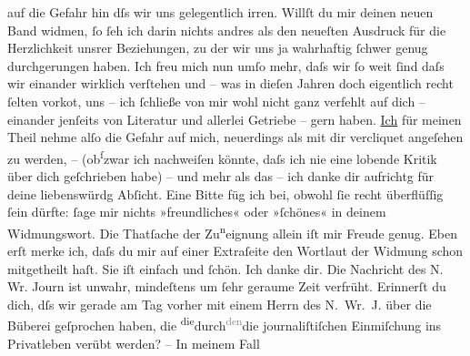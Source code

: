 \begin{ledgroupsized}[t]{13cm}
               auf die Gefahr hin dſs wir uns ge{\pb}legentlich irren.
               Willſt du mir deinen neuen
                  Band widmen, ſo ſeh ich darin nichts andres als den neueſten Ausdruck für die
               Herzlichkeit unsrer Beziehungen, zu der wir uns ja wahrhaftig ſchwer genug
               durchgerungen haben. Ich freu mich nun umſo mehr, daſs wir ſo weit ſind daſs wir
               einander wirklich verſtehen und – was in dieſen Jahren {\pb}doch eigentlich recht
               ſelten vorko{\geminationm}t, uns – ich ſchließe von mir wohl nicht
               ganz verfehlt auf dich – einander jenſeits von Literatur und allerlei Getriebe – gern
               haben. \uline{Ich} für meinen Theil nehme alſo die Gefahr auf
               mich, neuerdings als mit dir vercliquet angeſehen zu werden, \introOben{}–\introOben{} (ob\substVorne{}\textsuperscript{ſ}\substDazwischen{}z\substHinten{}war ich nachweiſen könnte, daſs ich nie eine lobende Kritik über dich
               geſchrieben habe) – und {\pb}mehr als das – ich danke dir aufrichtg für deine liebenswürdg Abſicht. Eine Bitte
               füg ich bei, obwohl ſie recht überflüſſig ſein dürfte: ſage mir nichts »freundliches«
               oder »ſchönes« in deinem Widmungswort. Die Thatſache der Zu\substVorne{}\textsuperscript{n}\substDazwischen{}ei\substHinten{}gnung allein iſt mir Freude genug.\pend
           \pstart
           Eben erſt merke ich, daſs du mir auf einer Extraſeite den Wortlaut der Widmung schon
               mitgetheilt haſt. Sie iſt einfach und ſchön. Ich danke dir.\pend
           \pstart
           {\pb}Die Nachricht des N. Wr. Journ ist unwahr, mindeſtens um ſehr
               geraume Zeit verfrüht. Erinnerſt du dich, dſs wir gerade am Tag vorher mit einem Herrn des N. Wr. J. über die Büberei geſprochen haben, die \substVorne{}\textsuperscript{die}\substDazwischen{}durch\substHinten{}{ }\substVorne{}\textsuperscript{\textcolor{gray}{den}}\substDazwischen{}die\substHinten{} journaliſtiſchen Einmiſchung ins Privatleben verübt werden? – In meinem Fall

\end{ledgroupsized}
